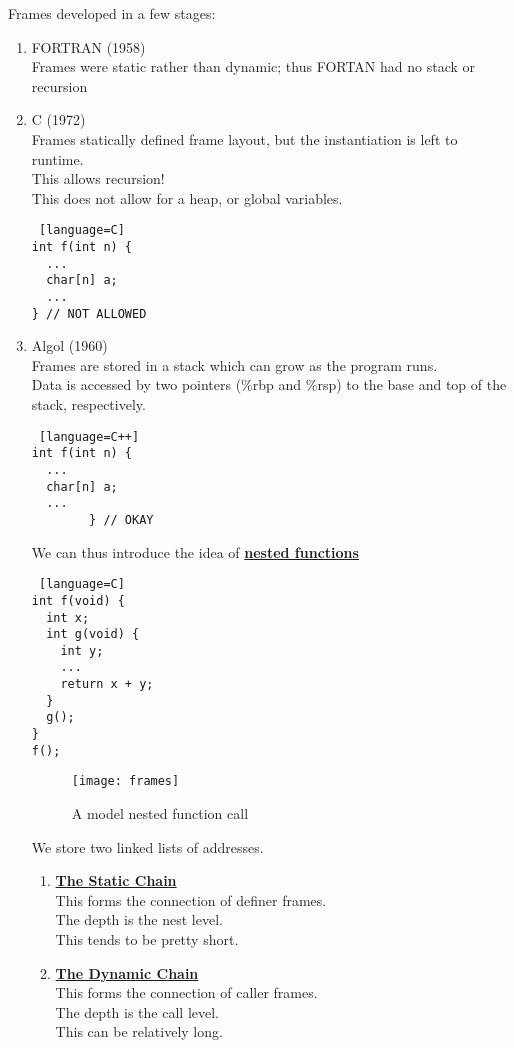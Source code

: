 \documentclass[../../lecture_notes.tex]{subfiles}
\begin{document}
\noindent Frames developed in a few stages:
\begin{enumerate} [itemsep=0mm]
	\item FORTRAN (1958)\\
		Frames were static rather than dynamic; thus FORTAN had no stack or recursion
	\item C (1972) \\
		Frames statically defined frame layout, but the instantiation is left to runtime.\\
		This allows recursion!\\
		This does not allow for a heap, or global variables.
		\begin{lstlisting} [language=C]
int f(int n) {
  ... 
  char[n] a; 
  ...
} // NOT ALLOWED
		\end{lstlisting}
	\item Algol (1960)\\
		Frames are stored in a stack which can grow as the program runs.\\
		Data is accessed by two pointers (\%rbp and \%rsp) to the base and top of the stack, respectively.
		\begin{lstlisting} [language=C++]
int f(int n) {
  ... 
  char[n] a; 
  ...
		} // OKAY
		\end{lstlisting}
		We can thus introduce the idea of \textbf{\underline{nested functions}}\\
		\begin{lstlisting} [language=C]
int f(void) {
  int x;
  int g(void) {
    int y;
    ...
    return x + y;
  }
  g();
}
f();
		\end{lstlisting}
	
		\begin{figure}[H]
			\centering
			\texttt{[image: frames]}
			\caption{A model nested function call}
			\label{fig:test}
		\end{figure}

		We store two linked lists of addresses.
		\begin{enumerate} [itemsep=0mm]
			\item \textbf{\underline{The Static Chain}}\\
				This forms the connection of definer frames.\\
				The depth is the nest level.\\
				This tends to be pretty short.
			\item \textbf{\underline{The Dynamic Chain}}\\
				This forms the connection of caller frames.\\
				The depth is the call level.\\
				This can be relatively long.
		\end{enumerate}


\end{enumerate}
\end{document}
